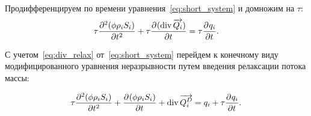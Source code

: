 Продифференцируем по времени уравнения~\eqref{eq:short_system} и домножим на $\tau$:
\begin{equation}
  \tau \pd[2]{(\phi \rho_i S_i)}{t} + \tau \pd{(\diver{ \overrightarrow{Q_i}})}{t} = \tau \pd{q_i}{t}.
\end{equation}

С учетом~\eqref{eq:div_relax} от~\eqref{eq:short_system} перейдем к конечному виду модифицированного уравнения неразрывности путем введения релаксации потока массы:

\begin{equation} \label{eq:mod_system}
  \tau \pd[2]{(\phi \rho_i S_i)}{t} + \pd{(\phi \rho_i S_i)}{t} + \diver{ \overrightarrow{Q_i^D}} = q_i + \tau \pd{q_i}{t}.
\end{equation}
